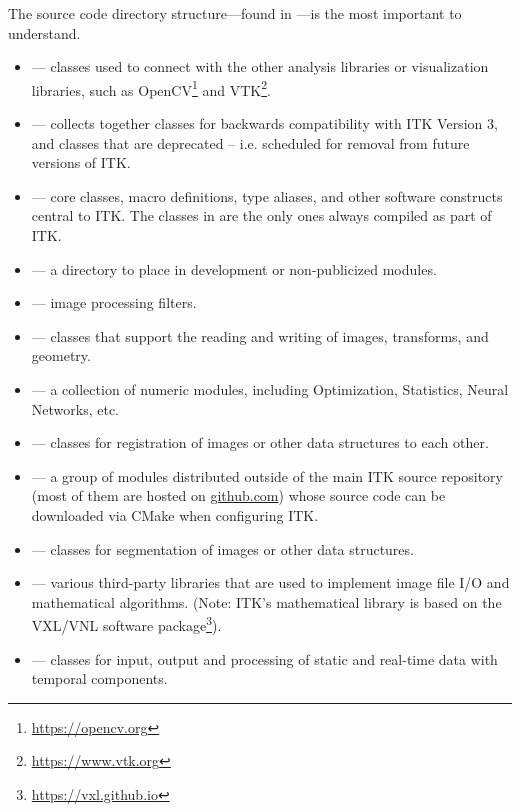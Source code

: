 The source code directory structure---found in ---is
the most important to understand.
\begin{itemize}
        \item {} --- classes used to connect with the
        other analysis libraries or visualization libraries, such as
        OpenCV\footnote{\url{https://opencv.org}} and
        VTK\footnote{\url{https://www.vtk.org}}.
        \item {} --- collects together classes
        for backwards compatibility with ITK Version 3, and classes that are
        deprecated -- i.e. scheduled for removal from future versions of ITK.
        \item {} --- core classes, macro definitions,
        type aliases, and other software constructs central to ITK. The classes
        in  are the only ones always compiled as part of ITK.
        \item {} --- a directory to place in development
        or non-publicized modules.
        \item {} --- image processing filters.
        \item {} --- classes that support the reading
        and writing of images, transforms, and geometry.
        \item {} --- a collection of numeric modules, including
        Optimization, Statistics, Neural Networks, etc.
        \item {} --- classes for registration of
        images or other data structures to each other.
        \item {} --- a group of modules distributed outside
        of the main ITK source repository (most of them are hosted on \url{github.com})
        whose source code can be downloaded via CMake when configuring ITK.
        \item {} --- classes for segmentation of
        images or other data structures.
        \item {} --- various third-party libraries
        that are used to implement image file I/O and mathematical algorithms.
        (Note: ITK's mathematical library is based
        on the VXL/VNL software
        package\footnote{\url{https://vxl.github.io}}).
        \item {} --- classes for input, output and processing
        of static and real-time data with temporal components.
\end{itemize}

